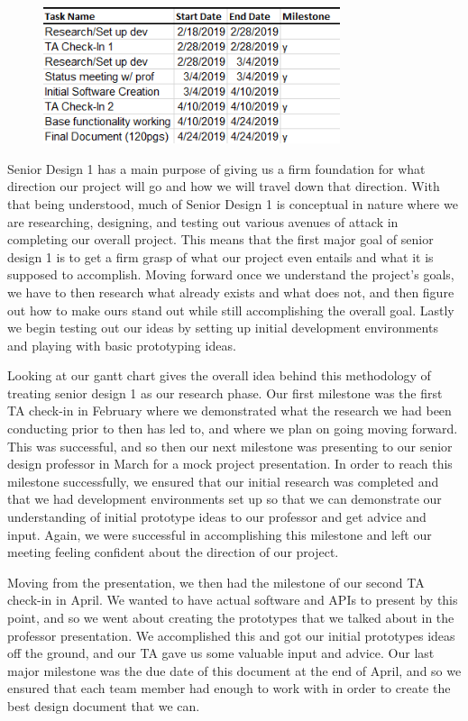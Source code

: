 \documentclass[12pt]{report}
\begin{document}
\begin{enumerate}
\newpage

\begin{figure}[h]
	\centering
	\includegraphics[width=0.6\linewidth, height=4.0cm]{SD1Dates}
\end{figure}

Senior Design 1 has a main purpose of giving us a firm foundation for what direction our project will go and how we will travel down that direction. With that being understood, much of Senior Design 1 is conceptual in nature where we are researching, designing, and testing out various avenues of attack in completing our overall project. This means that the first major goal of senior design 1 is to get a firm grasp of what our project even entails and what it is supposed to accomplish. Moving forward once we understand the project's goals, we have to then research what already exists and what does not, and then figure out how to make ours stand out while still accomplishing the overall goal. Lastly we begin testing out our ideas by setting up initial development environments and playing with basic prototyping ideas.

Looking at our gantt chart gives the overall idea behind this methodology of treating senior design 1 as our research phase. Our first milestone was the first TA check-in in February where we demonstrated what the research we had been conducting prior to then has led to, and where we plan on going moving forward. This was successful, and so then our next milestone was presenting to our senior design professor in March for a mock project presentation. In order to reach this milestone successfully, we ensured that our initial research was completed and that we had development environments set up so that we can demonstrate our understanding of initial prototype ideas to our professor and get advice and input. Again, we were successful in accomplishing this milestone and left our meeting feeling confident about the direction of our project.

Moving from the presentation, we then had the milestone of our second TA check-in in April. We wanted to have actual software and APIs to present by this point, and so we went about creating the prototypes that we talked about in the professor presentation. We accomplished this and got our initial prototypes ideas off the ground, and our TA gave us some valuable input and advice. Our last major milestone was the due date of this document at the end of April, and so we ensured that each team member had enough to work with in order to create the best design document that we can.


\end{enumerate}
\end{document}
